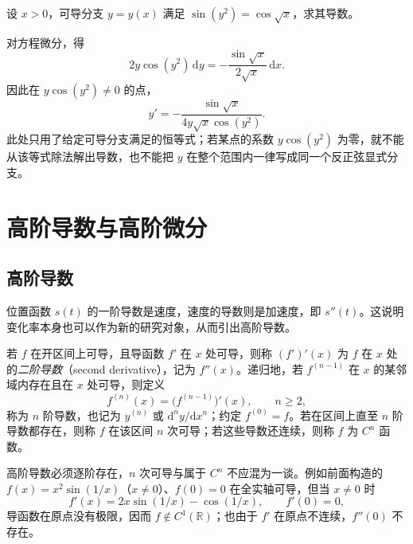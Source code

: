 \documentclass[UTF8,12pt,a4paper,fontset=fandol]{ctexbook}
\begin{document}
\begin{example}
\label{ex:implicit-differentiation-using-differentials}
设 $x>0$，可导分支 $y=y(x)$ 满足 $\sin(y^2)=\cos\sqrt{x}$，求其导数。
\end{example}
\begin{solve}
对方程微分，得
\[
    2y\cos(y^2)\,\mathrm dy
    =-\frac{\sin\sqrt{x}}{2\sqrt{x}}\,\mathrm dx.
\]
因此在 $y\cos(y^2)\ne0$ 的点，
\[
    y'=-\frac{\sin\sqrt{x}}{4y\sqrt{x}\cos(y^2)}.
\]
此处只用了给定可导分支满足的恒等式；若某点的系数 $y\cos(y^2)$ 为零，就不能从该等式除法解出导数，也不能把 $y$ 在整个范围内一律写成同一个反正弦显式分支。
\end{solve}

\section{高阶导数与高阶微分}
\label{sec:higher-derivatives-and-differentials}

\subsection{高阶导数}
\label{subsec:higher-derivatives}

位置函数 $s(t)$ 的一阶导数是速度，速度的导数则是加速度，即 $s''(t)$。这说明变化率本身也可以作为新的研究对象，从而引出高阶导数。

\begin{definition}
\label{def:higher-order-derivatives}
若 $f$ 在开区间上可导，且导函数 $f'$ 在 $x$ 处可导，则称 $(f')'(x)$ 为 $f$ 在 $x$ 处的\emph{二阶导数}（second derivative），记为 $f''(x)$。递归地，若 $f^{(n-1)}$ 在 $x$ 的某邻域内存在且在 $x$ 处可导，则定义
\[
    f^{(n)}(x)=\bigl(f^{(n-1)}\bigr)'(x),\qquad n\geq2,
\]
称为 $n$ 阶导数，也记为 $y^{(n)}$ 或 $\mathrm d^ny/\mathrm dx^n$；约定 $f^{(0)}=f$。若在区间上直至 $n$ 阶导数都存在，则称 $f$ 在该区间 $n$ 次可导；若这些导数还连续，则称 $f$ 为 $C^n$ 函数。
\end{definition}

高阶导数必须逐阶存在，$n$ 次可导与属于 $C^n$ 不应混为一谈。例如前面构造的 $f(x)=x^2\sin(1/x)$（$x\ne0$）、$f(0)=0$ 在全实轴可导，但当 $x\ne0$ 时
\[
    f'(x)=2x\sin(1/x)-\cos(1/x),\qquad f'(0)=0,
\]
导函数在原点没有极限，因而 $f\notin C^1(\mathbb R)$；也由于 $f'$ 在原点不连续，$f''(0)$ 不存在。
\end{document}
